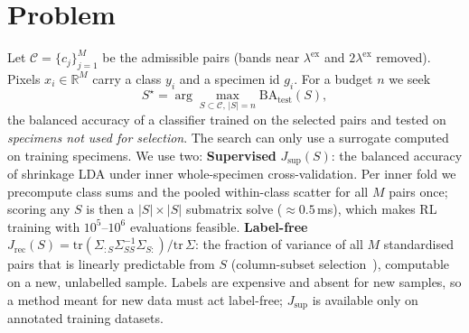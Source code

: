 \documentclass[conference]{IEEEtran}
\newcommand{\JS}{J_{\mathrm{sup}}}
\newcommand{\JR}{J_{\mathrm{rec}}}
\begin{document}
\section{Problem}
Let $\mathcal{C}=\{c_j\}_{j=1}^{M}$ be the admissible pairs (bands near $\lambda^{\mathrm{ex}}$ and $2\lambda^{\mathrm{ex}}$ removed). Pixels $x_i\in\mathbb{R}^M$ carry a class $y_i$ and a specimen id $g_i$. For a budget $n$ we seek
\begin{equation}
S^\star=\arg\max_{S\subset\mathcal{C},\,|S|=n} \mathrm{BA}_{\mathrm{test}}(S),
\end{equation}
the balanced accuracy of a classifier trained on the selected pairs and tested on \emph{specimens not used for selection}. The search can only use a surrogate computed on training specimens. We use two:
\textbf{Supervised} $\JS(S)$: the balanced accuracy of shrinkage LDA under inner whole-specimen cross-validation. Per inner fold we precompute class sums and the pooled within-class scatter for all $M$ pairs once; scoring any $S$ is then a $|S|\times|S|$ submatrix solve ($\approx0.5$\,ms), which makes RL training with $10^5$--$10^6$ evaluations feasible.
\textbf{Label-free} $\JR(S)=\mathrm{tr}(\Sigma_{:S}\Sigma_{SS}^{-1}\Sigma_{S:})/\mathrm{tr}\,\Sigma$: the fraction of variance of all $M$ standardised pairs that is linearly predictable from $S$ (column-subset selection~\cite{boutsidis2009css}), computable on a new, unlabelled sample.
Labels are expensive and absent for new samples, so a method meant for new data must act label-free; $\JS$ is available only on annotated training datasets.

\end{document}
